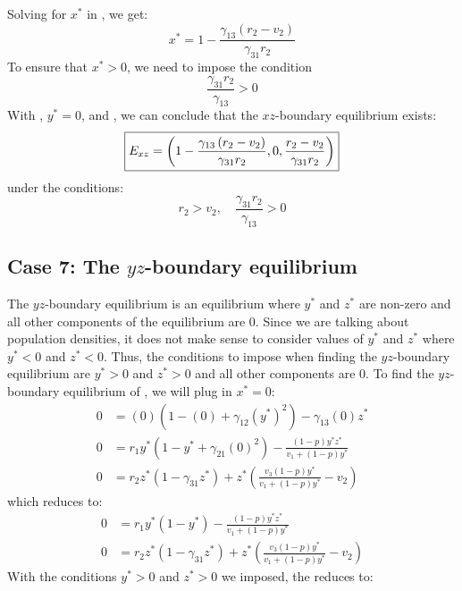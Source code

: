 Solving for $x^*$ in , we get:
\begin{equation}
    x^*=1-\frac{\gamma_{13}\left(r_2-v_2\right)}{\gamma_{31}r_2}
    \label{eq:4.13}
\end{equation}
To ensure that $x^*>0$, we need to impose the condition
\[
\frac{\gamma_{31}r_2}{\gamma_{13}}>0
\]
With , $y^*=0$, and , we can conclude that the $xz$-boundary equilibrium exists:
\[
\fbox{$\displaystyle E_{xz}=\left(
1-\frac{\gamma_{13}\left(r_2-v_2\right)}{\gamma_{31}r_2},
0,
\frac{r_2-v_2}{\gamma_{31}r_2}
\right)$}
\]
under the conditions:
\[
r_2>v_2,\quad \frac{\gamma_{31}r_2}{\gamma_{13}}>0
\]

\subsection{Case 7: The $yz$-boundary equilibrium}\label{subsec:yz_boundary_equilibrium}
The $yz$-boundary equilibrium is an equilibrium where $y^*$ and $z^*$ are non-zero and all other components of the equilibrium are 0. Since we are talking about population densities, it does not make sense to consider values of $y^*$ and $z^*$ where $y^*<0$ and $z^*<0$. Thus, the conditions to impose when finding the $yz$-boundary equilibrium are $y^*>0$ and $z^*>0$ and all other components are 0. To find the $yz$-boundary equilibrium of , we will plug in $x^*=0$:
\begin{align*}
    0 &= (0)\left(1-(0)+\gamma_{12}\left(y^*\right)^2\right)-\gamma_{13}(0)z^*\\
    0 &= r_1y^*\left(1-y^*+\gamma_{21}(0)^2\right)-\frac{\left(1-p\right)y^*z^*}{v_1+\left(1-p\right)y^*}\\
    0 &= r_2z^*\left(1-\gamma_{31}z^*\right)+z^*\left(\frac{v_3\left(1-p\right)y^*}{v_1+\left(1-p\right)y^*}-v_2\right)
\end{align*}
which reduces to:
\begin{subequations}
    \begin{align}
        0 &= r_1y^*\left(1-y^*\right)-\frac{\left(1-p\right)y^*z^*}{v_1+\left(1-p\right)y^*}
        \label{eq:4.14a}\\
        0 &= r_2z^*\left(1-\gamma_{31}z^*\right)+z^*\left(\frac{v_3\left(1-p\right)y^*}{v_1+\left(1-p\right)y^*}-v_2\right)
        \label{eq:4.14b}
    \end{align}
    \label{eq:4.14}
\end{subequations}
With the conditions $y^*>0$ and $z^*>0$ we imposed, the  reduces to:
